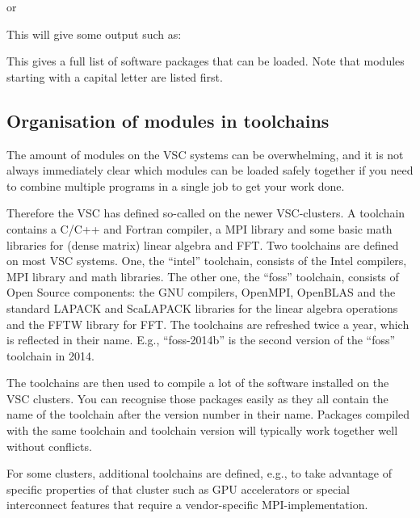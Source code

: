 \begin{prompt}
\end{prompt}

or

\begin{prompt}
\end{prompt}

This will give some output such as:


This gives a full list of software packages that can be loaded. Note that
modules starting with a capital letter are listed first.

\subsection{Organisation of modules in toolchains}

The amount of modules on the VSC systems can be overwhelming, and it is not
always immediately clear which modules can be loaded safely together if you
need to combine multiple programs in a single job to get your work done.

Therefore the VSC has defined so-called  on the newer VSC-clusters.
A toolchain contains a C/C++ and Fortran compiler, a MPI library and some basic
math libraries for (dense matrix) linear algebra and FFT. Two toolchains are
defined on most VSC systems. One, the ``intel'' toolchain, consists of the Intel
compilers, MPI library and math libraries. The other one, the ``foss'' toolchain,
consists of Open Source components: the GNU compilers, OpenMPI, OpenBLAS and
the standard LAPACK and ScaLAPACK libraries for the linear algebra operations
and the FFTW library for FFT. The toolchains are refreshed twice a year,
which is reflected in their name. E.g., ``foss-2014b'' is the second version
of the ``foss'' toolchain in 2014.

The toolchains are then used to compile a lot of the software installed on
the VSC clusters. You can recognise those packages easily as they all contain the
name of the toolchain after the version number in their name. Packages
compiled with the same toolchain and toolchain version will typically work
together well without conflicts.

For some clusters, additional toolchains are defined, e.g., to take advantage
of specific properties of that cluster such as GPU accelerators or special
interconnect features that require a vendor-specific MPI-implementation.

